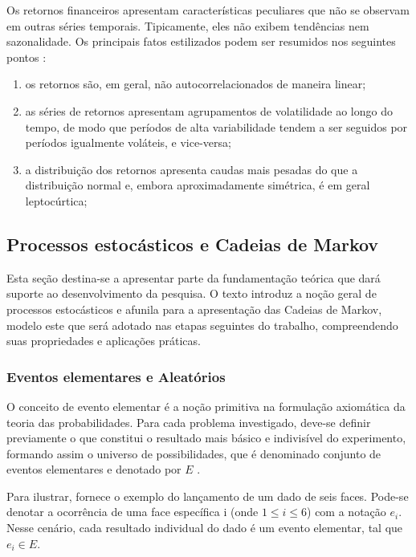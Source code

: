 \documentclass[
    12pt,                %
    openright,           %
    oneside,             %
    a4paper,             %
    english,             %
    brazil               %
]{abntex2}
\begin{document}
Os retornos financeiros apresentam características peculiares que não se observam em outras séries temporais. Tipicamente, eles não exibem tendências nem sazonalidade. Os principais fatos estilizados podem ser resumidos nos seguintes pontos \cite{morettin2018analise}:
\begin{enumerate}
    \item os retornos são, em geral, não autocorrelacionados de maneira linear;
    \item as séries de retornos apresentam agrupamentos de volatilidade ao longo do tempo, de modo que períodos de alta variabilidade tendem a ser seguidos por períodos igualmente voláteis, e vice-versa;
    \item a distribuição dos retornos apresenta caudas mais pesadas do que a distribuição normal e, embora aproximadamente simétrica, é em geral leptocúrtica;
\end{enumerate}

\subsection{Processos estocásticos e Cadeias de Markov}
\label{sec:processos_estocasticos}

Esta seção destina-se a apresentar parte da fundamentação teórica que dará suporte ao desenvolvimento da pesquisa. O texto introduz a noção geral de processos 
estocásticos e afunila para a apresentação das Cadeias de Markov, modelo este que será adotado nas etapas seguintes do trabalho, compreendendo suas propriedades e 
aplicações práticas.

\subsubsection{Eventos elementares e Aleatórios}
O conceito de evento elementar é a noção primitiva na formulação axiomática da teoria das probabilidades. Para cada problema investigado, deve-se definir 
previamente o que constitui o resultado mais básico e indivisível do experimento, formando assim o universo de possibilidades, que é denominado conjunto de 
eventos elementares e denotado por $E$ \cite{FISZ}.

Para ilustrar,  fornece o exemplo do lançamento de um dado de seis faces. Pode-se denotar a ocorrência de uma face específica i 
(onde $1 \leq i \leq 6$) com a notação $e_i$. Nesse cenário, cada resultado individual do dado é um evento elementar, tal que $e_i \in E$.
\end{document}
